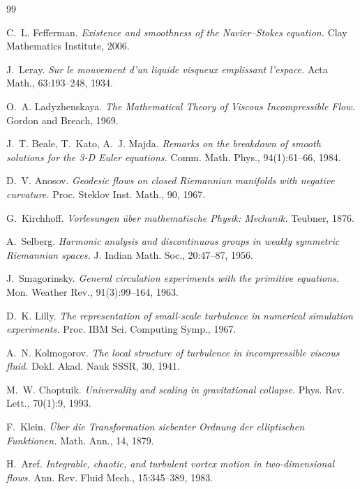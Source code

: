 \documentclass[11pt,a4paper,twoside]{article}
\theoremstyle{remark}
\begin{document}
\begin{thebibliography}{99}

 C.~L. Fefferman. \textit{Existence and smoothness of the Navier--Stokes equation.} Clay Mathematics Institute, 2006.

 J.~Leray. \textit{Sur le mouvement d'un liquide visqueux emplissant l'espace.} Acta Math., 63:193--248, 1934.

 O.~A. Ladyzhenskaya. \textit{The Mathematical Theory of Viscous Incompressible Flow.} Gordon and Breach, 1969.

 J.~T. Beale, T.~Kato, A.~J. Majda. \textit{Remarks on the breakdown of smooth solutions for the 3-D Euler equations.} Comm. Math. Phys., 94(1):61--66, 1984.

 D.~V. Anosov. \textit{Geodesic flows on closed Riemannian manifolds with negative curvature.} Proc. Steklov Inst. Math., 90, 1967.

 G.~Kirchhoff. \textit{Vorlesungen über mathematische Physik: Mechanik.} Teubner, 1876.

 A.~Selberg. \textit{Harmonic analysis and discontinuous groups in weakly symmetric Riemannian spaces.} J. Indian Math. Soc., 20:47--87, 1956.

 J.~Smagorinsky. \textit{General circulation experiments with the primitive equations.} Mon. Weather Rev., 91(3):99--164, 1963.

 D.~K. Lilly. \textit{The representation of small-scale turbulence in numerical simulation experiments.} Proc. IBM Sci. Computing Symp., 1967.

 A.~N. Kolmogorov. \textit{The local structure of turbulence in incompressible viscous fluid.} Dokl. Akad. Nauk SSSR, 30, 1941.

 M.~W. Choptuik. \textit{Universality and scaling in gravitational collapse.} Phys. Rev. Lett., 70(1):9, 1993.

 F.~Klein. \textit{Über die Transformation siebenter Ordnung der elliptischen Funktionen.} Math. Ann., 14, 1879.

 H.~Aref. \textit{Integrable, chaotic, and turbulent vortex motion in two-dimensional flows.} Ann. Rev. Fluid Mech., 15:345--389, 1983.


\end{thebibliography}
\end{document}
